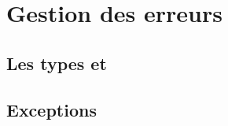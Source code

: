 \section{Gestion des erreurs}
\label{error-handling}

\subsection{Les types  et }

\subsection{Exceptions}
